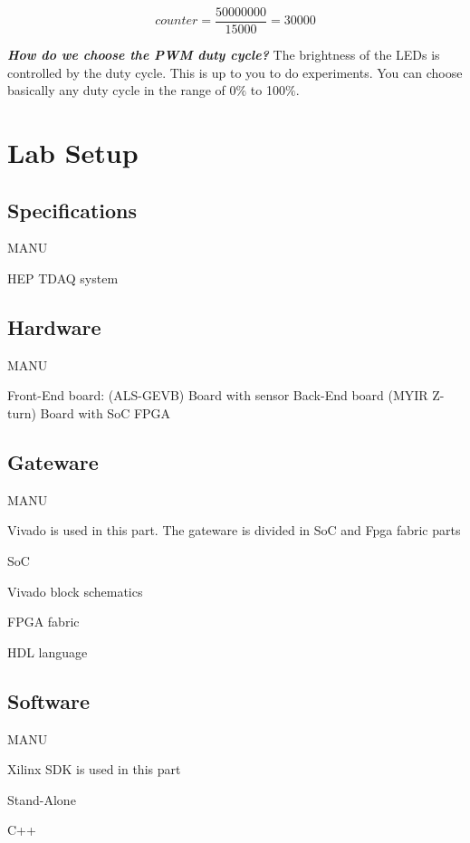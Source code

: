 \documentclass{article}
\begin{document}
\begin{equation}
counter = \frac{50000000}{15000} = 30000
\end{equation}

\textbf{\textit{How do we choose the PWM duty cycle?}} The brightness of the LEDs is controlled by the duty cycle. This is up to you to do experiments. You can choose basically any duty cycle in the range of 0$\%$ to 100$\%$.




\clearpage






\section{Lab Setup}

\subsection{Specifications}
{\color{red}MANU}

HEP TDAQ system


\subsection{Hardware}
{\color{red}MANU}

Front-End board: (ALS-GEVB)
Board with sensor
Back-End board (MYIR Z-turn)
Board with SoC FPGA

\subsection{Gateware}
{\color{red}MANU}

Vivado is used in this part. The gateware is divided in SoC and Fpga fabric parts

SoC

Vivado block schematics


FPGA fabric

HDL language


\subsection{Software}
{\color{red}MANU}

Xilinx SDK is used in this part

Stand-Alone

C++
\end{document}
